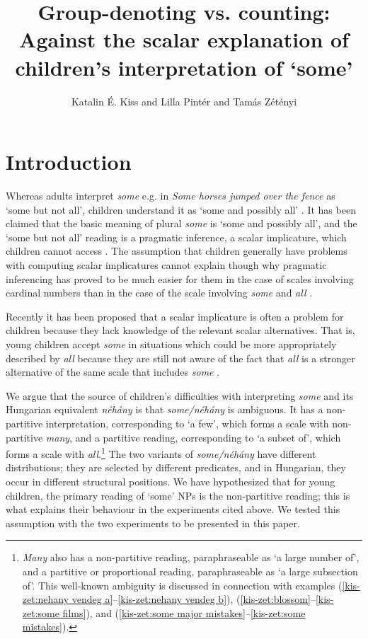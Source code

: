 \documentclass[output=paper]{langscibook}
\author{Katalin {É. Kiss}\affiliation{Research Institute for Linguistics} and Lilla Pintér\affiliation{Pázmány Péter Catholic University, Research Institute for Linguistics} and  Tamás Zétényi\affiliation{Budapest University of Technology and Economics}}
\title[Group-denoting vs. counting]{Group-denoting vs. counting: Against the scalar explanation of children's interpretation of `some'}
\begin{document}
\maketitle


\section{Introduction}\label{kis-zet:sec:introduction}

Whereas adults interpret \textit{some} e.g. in  \textit{Some horses jumped over the fence} as `some but not all', children understand it as `some and possibly all' \citep[e.g.][]{noveck2001children,papafragou2004children}. It has been claimed that the basic meaning of plural \textit{some} is `some and possibly all', and the `some but not all' reading is a pragmatic inference, a scalar implicature, which children cannot access \citep[see][]{noveck2001children,chierchia2001acquisition,papafragou2003scalar,guasti2005children,foppolo2012scalar,huang2009online,katsos2011pragmatic,barner2011accessing}. The assumption that children generally have problems with computing scalar implicatures cannot explain though why pragmatic inferencing has proved to be much easier for them in the case of scales involving cardinal numbers than in the case of the scale involving \textit{some} and \textit{all} \citep{papafragou2003scalar}.

Recently it has been proposed that a scalar implicature is often a problem for children because they lack knowledge of the relevant scalar alternatives. That is, young children accept \textit{some} in situations which could be more appropriately described by \textit{all} because they are still not aware of the fact that \textit{all} is a stronger alternative of the same scale that includes \textit{some} \citep{barner2011accessing,foppolo2012scalar,pagliarini2018children}.

We argue that the source of children's difficulties with interpreting \textit{some} and its Hungarian equivalent \textit{néhány} is that \textit{some/néhány} is ambiguous. It has a non-partitive interpretation, corresponding to `a few', which forms a scale with non-partitive \textit{many}, and a partitive reading, corresponding to `a subset of', which forms a scale with \textit{all}.\footnote{\textit{Many} also has a non-partitive reading, paraphraseable as `a large number of', and a partitive or proportional reading, paraphraseable as `a large subsection of'. This well-known ambiguity is discussed in connection with examples (\ref{kis-zet:nehany vendeg a}--\ref{kis-zet:nehany vendeg b}), (\ref{kis-zet:blossom}--\ref{kis-zet:some films}), and (\ref{kis-zet:some major mistakes}--\ref{kis-zet:some mistakes}).} The two variants of \textit{some/néhány} have different distributions; they are selected by different predicates, and in Hungarian, they occur in different structural positions. We have hypothesized that for young children, the primary reading of `some' NPs is the non-partitive reading; this is what explains their behaviour in the experiments cited above. We tested this assumption with the two experiments to be presented in this paper.
\end{document}
